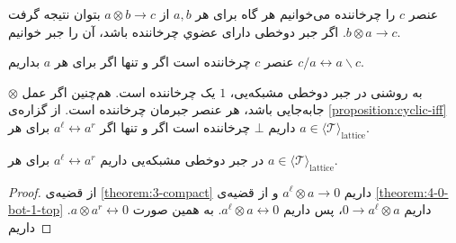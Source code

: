 \begin{definition}
عنصر 
$c$
را چرخاننده می‌خوانیم هر گاه برای هر 
$a, b$
از
$a \otimes b \rightarrow c$
بتوان نتیجه گرفت
$b \otimes a \rightarrow c$.
اگر جبر دوخطی دارای عضوي چرخاننده باشد، آن را جبر
خوانیم.
\end{definition}

\begin{proposition}
\label{proposition:cyclic-iff}
عنصر
$c$
چرخاننده است اگر و تنها اگر برای هر
$a$
بداریم
$c / a \leftrightarrow a \backslash c$.
\end{proposition}

به روشنی در جبر دوخطی مشبکه‌یی، 
$1$
یک چرخاننده است. هم‌چنین اگر عمل 
$\otimes$
جابه‌جایی باشد، هر عنصر جبرمان چرخاننده است.
از گزاره‌ی
\ref{proposition:cyclic-iff}
داریم 
$\bot$
چرخاننده است اگر و تنها اگر
$a^\ell \leftrightarrow a^r$
برای هر
$a \in \langle \mathcal{T} \rangle_{\mathrm{lattice}}$.

\begin{theorem}
در جبر دوخطی مشبکه‌یی داریم
$a^\ell \leftrightarrow a^r$
برای هر
$a \in \langle \mathcal{T} \rangle_{\mathrm{lattice}}$.
\end{theorem}

\begin{proof}
از قضیه‌ی
\ref{theorem:3-compact}
داریم
$a^\ell \otimes a \rightarrow 0$
و از قضیه‌ی
\ref{theorem:4-0-bot-1-top}
داریم
$0 \rightarrow a^\ell \otimes a$،
پس داریم
$a^\ell \otimes a \leftrightarrow 0$.
به همین صورت
$a \otimes a^r \leftrightarrow 0$.
داریم
\end{proof}